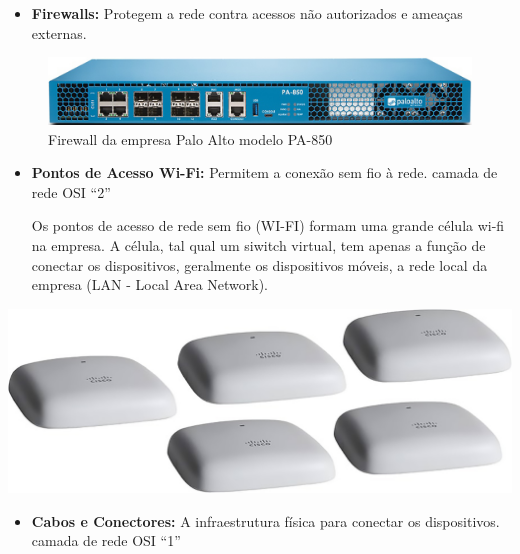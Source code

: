 \documentclass[
]{book}
\providecommand{\tightlist}{%
  \setlength{\itemsep}{0pt}\setlength{\parskip}{0pt}}
\begin{document}
\begin{itemize}
\tightlist
\item
  \textbf{Firewalls:} Protegem a rede contra acessos não autorizados e ameaças externas.
\end{itemize}

\begin{figure}
\centering
\includegraphics{images/InfraEstrutura/Redes/firewall-PaloAlto-PA850.jpg}
\caption{Firewall da empresa Palo Alto modelo PA-850}
\end{figure}

\begin{itemize}
\item
  \textbf{Pontos de Acesso Wi-Fi:} Permitem a conexão sem fio à rede. camada de rede OSI ``2''

  Os pontos de acesso de rede sem fio (WI-FI) formam uma grande célula wi-fi na empresa. A célula, tal qual um siwitch virtual, tem apenas a função de conectar os dispositivos, geralmente os dispositivos móveis, a rede local da empresa (LAN - Local Area Network).
\end{itemize}

\href{Pontos\%20de\%20Acesso\%20CISCO}{\includegraphics{images/InfraEstrutura/Redes/Ponto_De_Acesso-cisco.jpg}}

\begin{itemize}
\tightlist
\item
  \textbf{Cabos e Conectores:} A infraestrutura física para conectar os dispositivos. camada de rede OSI ``1''
\end{itemize}
\end{document}
